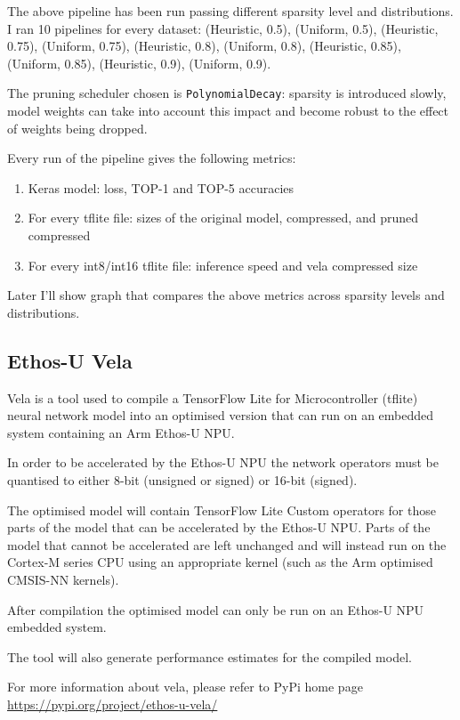 The above pipeline has been run passing different sparsity level and
distributions. I ran 10 pipelines for every dataset: (Heuristic, 0.5),
(Uniform, 0.5), (Heuristic, 0.75), (Uniform, 0.75), (Heuristic, 0.8),
(Uniform, 0.8), (Heuristic, 0.85), (Uniform, 0.85), (Heuristic, 0.9),
(Uniform, 0.9).

The pruning scheduler chosen is \texttt{PolynomialDecay}: sparsity is
introduced slowly, model weights can take into account this impact and become
robust to the effect of weights being dropped.

Every run of the pipeline gives the following metrics:
\begin{enumerate}
    \item Keras model: loss, TOP-1 and TOP-5 accuracies
    \item For every tflite file: sizes of the original model, compressed, and
        pruned compressed
    \item For every int8/int16 tflite file: inference speed and vela compressed
        size
\end{enumerate}

Later I'll show graph that compares the above metrics across sparsity levels
and distributions.

\subsection{Ethos-U Vela}\label{sub:vela}
Vela is a tool used to compile a TensorFlow Lite for Microcontroller (tflite)
neural network model into an optimised version that can run on an embedded
system containing an Arm Ethos-U NPU\@.

In order to be accelerated by the Ethos-U NPU the network operators must be
quantised to either 8-bit (unsigned or signed) or 16-bit (signed).

The optimised model will contain TensorFlow Lite Custom operators for those
parts of the model that can be accelerated by the Ethos-U NPU\@. Parts of the
model that cannot be accelerated are left unchanged and will instead run on the
Cortex-M series CPU using an appropriate kernel (such as the Arm optimised
CMSIS-NN kernels).

After compilation the optimised model can only be run on an Ethos-U NPU
embedded system.

The tool will also generate performance estimates for the compiled model.

For more information about vela, please refer to PyPi home page
\url{https://pypi.org/project/ethos-u-vela/}


